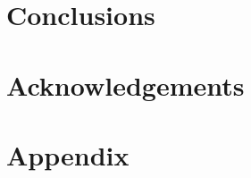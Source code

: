 \documentclass[twoside,twocolumn,9pt]{article}
\renewcommand{\refname}{Notes and references}
\begin{document}
\section{Conclusions}

\section{Acknowledgements}

\section{Appendix}





\balance


\end{document}
